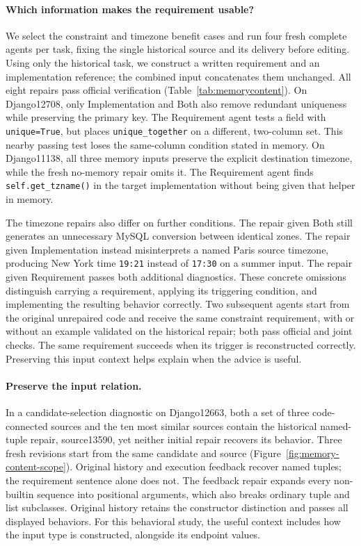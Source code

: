 \paragraph{Which information makes the requirement usable?}
We select the constraint and timezone benefit cases and run four fresh complete agents per task, fixing the single historical source and its delivery before editing.
Using only the historical task, we construct a written requirement and an implementation reference; the combined input concatenates them unchanged.
All eight repairs pass official verification (Table~\ref{tab:memorycontent}).
On Django12708, only Implementation and Both also remove redundant uniqueness while preserving the primary key.
The Requirement agent tests a field with \texttt{unique=True}, but places \texttt{unique\_together} on a different, two-column set.
This nearby passing test loses the same-column condition stated in memory.
On Django11138, all three memory inputs preserve the explicit destination timezone, while the fresh no-memory repair omits it.
The Requirement agent finds \texttt{self.get\_tzname()} in the target implementation without being given that helper in memory.



The timezone repairs also differ on further conditions.
The repair given Both still generates an unnecessary MySQL conversion between identical zones. The repair given Implementation instead misinterprets a named Paris source timezone, producing New York time \texttt{19:21} instead of \texttt{17:30} on a summer input.
The repair given Requirement passes both additional diagnostics.
These concrete omissions distinguish carrying a requirement, applying its triggering condition, and implementing the resulting behavior correctly.
Two subsequent agents start from the original unrepaired code and receive the same constraint requirement, with or without an example validated on the historical repair; both pass official and joint checks.
The same requirement succeeds when its trigger is reconstructed correctly.
Preserving this input context helps explain when the advice is useful.

\paragraph{Preserve the input relation.}
In a candidate-selection diagnostic on Django12663, both a set of three
code-connected sources and the ten most similar sources contain the
historical named-tuple repair, source13590,
yet neither initial repair recovers its behavior. Three fresh revisions start
from the same candidate and source (Figure~\ref{fig:memory-content-scope}).
Original history and execution feedback recover named tuples; the requirement
sentence alone does not. The feedback repair expands every non-builtin
sequence into positional arguments, which also breaks ordinary tuple and list
subclasses. Original history retains the constructor distinction and passes
all displayed behaviors. For this behavioral study, the useful context includes
how the input type is constructed, alongside its endpoint values.

